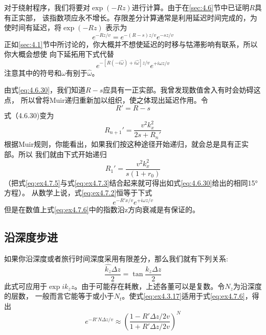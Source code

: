 对于绕射程序，我们将要对$\exp(-Rz)$进行计算。由于在\ref{sec:4.6}节中已证明$R$具有正实部，
该指数项应永不增长。存限差分计算通常是利用延迟时间完成的，为使时间有延迟，将$\exp(-Rz)$
表示为
\begin{equation}
e^{-Rz/v}=e^{-(R-s)z/v}e^{-sz/v}
\label{eq:4.7.1}
\end{equation}
正如\ref{sec:4.1}节中所讨论的，你大概并不想使延迟的时移与牯滞影响有联系，所以你大概会想使
向下延拓用下式代替
\begin{equation}
e^{-[R(-i\hat{\omega})+i\hat{\omega}]z/v}e^{+i\omega z/v}
\label{eq:ex4.7.2}
\end{equation}
注意其中的符号和$\omega$有别于$\hat{\omega}$。

由式\ref{eq:4.6.30}，我们知道$R-s$应具有一正实部。我曾发现数值舍入有时会妨碍这点，
所以曾将Muir递归重新加以组织，使之体现出延迟作用。令
\begin{equation}
R'=R-s
\label{eq:ex4.7.3}
\end{equation}
式（4.6.30)变为
\begin{equation}
R_{n+1}'=\frac{v^2k_x^2}{2s+R_n'}
\label{eq:ex4.7.4}
\end{equation}
根据Muir规则，你能看出，如果我们按这种途径开始递归，就会总是具有正实部。所以
我们就由下式开始递归
\begin{equation}
R_1'=\frac{v^2k_x^2}{s(1+r_0)}
\label{eq:ex4.7.5}
\end{equation}
（把式\ref{eq:ex4.7.5}与式\ref{eq:ex4.7.3}结合起来就可得出如式\ref{eq:4.6.30}给出的相同15°方程）。
从数学上说，式\ref{eq:ex4.7.2}恒等于下式
\begin{equation}
e^{-R'x/v}e^{+i\omega z/v}
\label{eq:ex4.7.6}
\end{equation}
但是在数值上式\ref{eq:ex4.7.6}中的指数沿z方向衰减是有保证的。

\subsection{沿深度步进}
\label{sec:4.7.4}

如果你沿深度或者旅行时间深度采用有限差分，那么我们就有下列关系:
\begin{equation*}
\frac{\hat{k_z}\Delta z}{2}=\tan\frac{k_z\Delta z}{2}
\end{equation*}
此式可应用于$\exp ik_zz$。由于可能存在耗散，上述各董可以是复数。令$N_z$为沿深度的层数，
一般而言它能等于或小于$N_t$。使式\ref{eq:ex4.3.17}适用于式\ref{eq:ex4.7.6}，得出
\begin{equation}
e^{-R'N\Delta z/v}\approx (\frac{1-R'\Delta z/2v}{1+R'\Delta z/2v})^N
\label{eq:ex4.7.7}
\end{equation}

